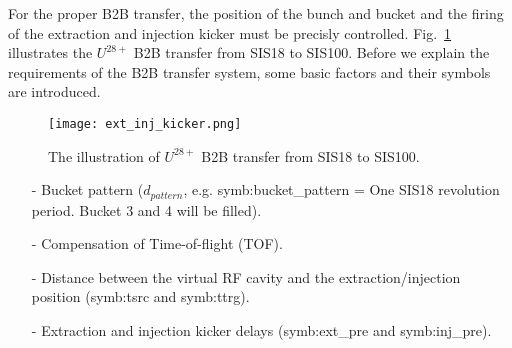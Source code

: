 For the proper B2B transfer, the position of the bunch and bucket and the firing of the extraction and injection kicker must be precisly controlled. Fig.~\ref{ext_inj_kicker} illustrates the $U^{28+}$ B2B transfer from SIS18 to SIS100. Before we explain the requirements of the B2B transfer system, some basic factors and their symbols are introduced.

\begin{figure}[!htb]
   \centering   
   \texttt{[image: ext\_inj\_kicker.png]}
   \caption{The illustration of $U^{28+}$ B2B transfer from SIS18 to SIS100.}
   \label{ext_inj_kicker}
\end{figure}

\begin{itemize}
\item[-] Bucket pattern ($d_{pattern}$, e.g. \gls{symb:bucket_pattern} = One SIS18 revolution period. Bucket 3 and 4 will be filled).
\item[-] Compensation of Time-of-flight (\gls{TOF}). 
\item[-] Distance between the virtual RF cavity and the extraction/injection position  (\gls{symb:tsrc} and \gls{symb:ttrg}). 
\item[-] Extraction and injection kicker delays (\gls{symb:ext_pre} and \gls{symb:inj_pre}).
\end{itemize}

